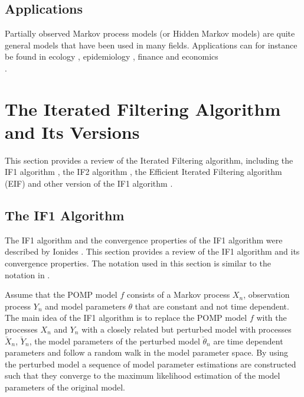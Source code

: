 \documentclass[twoside,openright]{report}
\begin{document}
\subsection{Applications}
Partially observed Markov process models (or Hidden Markov models) are quite general models that have been used in many fields. Applications can for instance be found in  ecology \cite{chan2011discussion}, epidemiology \cite{king2008inapparent}, finance \cite{breto2014idiosyncratic} \cite{johannes2009optimal} and  economics \\  \cite{fernandez2007estimating}. 


\section{The Iterated Filtering Algorithm and Its Versions}

This section provides a review of the Iterated Filtering algorithm, including the  IF1 algorithm  \cite{ionides2011iterated}, the IF2 algorithm \cite{king2015statistical}, the Efficient Iterated Filtering algorithm (EIF) \cite{ionides2012efficient} and other version of the IF1 algorithm \cite{lindstrom2013tuned}. 

\subsection{The IF1 Algorithm} \label{seq:the_IF1_alg}
The IF1 algorithm and the convergence properties of the IF1 algorithm were described by Ionides \cite{ionides2011iterated}. This section provides a review of the IF1 algorithm and its convergence properties. The notation used in this section is similar to the notation in  \cite{ionides2011iterated}. 

Assume that the POMP model $f$ consists of a Markov process $X_n$, observation process $Y_n$ and model parameters $\theta$ that are constant and not time dependent. The main idea of the IF1 algorithm is to replace the POMP model $f$ with the processes  $X_n$ and $Y_n$ with a closely related but perturbed model with processes $\breve{X}_n$, $\breve{Y}_n$, the model parameters of the perturbed model $\breve{\theta}_n$ are time dependent parameters and follow a random walk in the model parameter space. By using the perturbed model a sequence of model parameter estimations are constructed such that they converge to the maximum likelihood estimation of the model parameters of the original model.  
\end{document}
